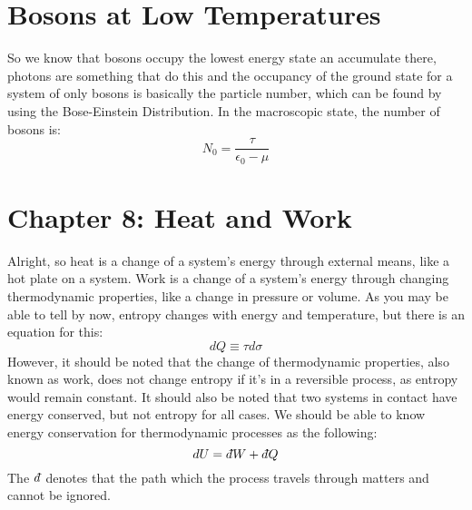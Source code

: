 \documentclass[arial]{article}
\newcommand{\dbar}{d\hspace*{-0.08em}\bar{}\hspace*{0.1em}}
\begin{document}
\section*{Bosons at Low Temperatures}
So we know that bosons occupy the lowest energy state an accumulate there, photons are something that do this and the occupancy of the ground state for a system of only bosons is basically the particle number, which can be found by using the Bose-Einstein Distribution. In the macroscopic state, the number of bosons is:
\begin{equation}
N_0=\frac{\tau}{\epsilon_0-\mu}
\end{equation}
\section*{Chapter 8: Heat and Work}
Alright, so heat is a change of a system's energy through external means, like a hot plate on a system. Work is a change of a system's energy through changing thermodynamic properties, like a change in pressure or volume. As you may be able to tell by now, entropy changes with energy and temperature, but there is an equation for this:
\begin{equation}
dQ\equiv\tau d\sigma
\end{equation}
However, it should be noted that the change of thermodynamic properties, also known as work, does not change entropy if it's in a reversible process, as entropy would remain constant. It should also be noted that two systems in contact have energy conserved, but not entropy for all cases.
We should be able to know energy conservation for thermodynamic processes as the following:
\begin{equation}
dU=\dbar W+\dbar Q
\end{equation}
The $\dbar$ denotes that the path which the process travels through matters and cannot be ignored.
\end{document}

